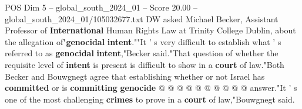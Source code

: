 \begin{textsample}{POS Dim 5 – global\_south\_2024\_01 – Score 20.00 – global\_south\_2024\_01/105032677.txt}
DW asked Michael Becker, Assistant Professor of \textbf{International} Human Rights Law at Trinity College Dublin, about the allegation of"\textbf{genocidal} \textbf{intent}.""It ' s very difficult to establish what ' s referred to as \textbf{genocidal} \textbf{intent},"Becker said."That question of whether the requisite level of \textbf{intent} is present is difficult to show in a \textbf{court} of law."Both Becker and Bouwgnegt agree that establishing whether or not Israel has \textbf{committed} or is \textbf{committing} \textbf{genocide} @ @ @ @ @ @ @ @ @ @ answer."It ' s one of the most challenging \textbf{crimes} to prove in a \textbf{court} of law,"Bouwgnegt said.

\end{textsample}
